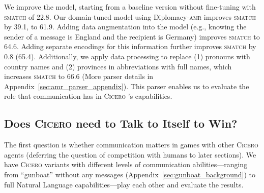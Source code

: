 \documentclass[oneside]{memoir}
\newcommand{\cicero}{\abr{Cicero} }
\newcommand{\abr}[1]{\textsc{#1}}
\begin{document}
We improve the model, starting from a baseline version without
fine-tuning with \abr{smatch} of 22.8.
%
Our domain-tuned model using Diplomacy-\abr{amr} improves \abr{smatch}
by 39.1, to 61.9.
%
Adding data augmentation into the model (e.g., knowing the sender of a
message is England and the recipient is Germany) improves \abr{smatch} to 64.6.
%
Adding separate encodings for this information further improves
\abr{smatch} by 0.8 (65.4).
%
Additionally, we apply data processing to replace (1) pronouns with country names and (2) provinces in abbreviations with full names, which increases \abr{smatch} to 66.6 (More parser details in
Appendix~\ref{sec:amr_parser_appendix}).
%
This parser enables us to evaluate the role that communication has in
\cicero{}'s capabilities.

\subsection{Does \cicero{} need to Talk to Itself to Win?}
\label{sec:Comp_comp_games}


%

The first question is whether communication matters in games with other \cicero{} agents (deferring the question of competition with humans to later sections).
We have \cicero{} variants with different levels of communication abilities---ranging from ``gunboat'' without any messages (Appendix~\ref{sec:gunboat_background}) to full Natural Language capabilities---play each other and evaluate the results.
\end{document}
